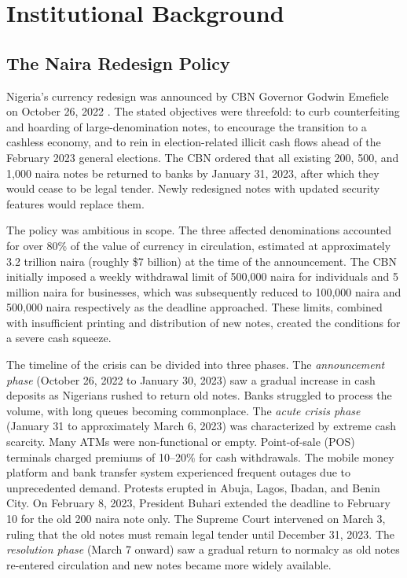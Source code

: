 \documentclass[12pt]{article}
\begin{document}
\section{Institutional Background}

\subsection{The Naira Redesign Policy}

Nigeria's currency redesign was announced by CBN Governor Godwin Emefiele on October 26, 2022 \citep{cbn2022redesign}. The stated objectives were threefold: to curb counterfeiting and hoarding of large-denomination notes, to encourage the transition to a cashless economy, and to rein in election-related illicit cash flows ahead of the February 2023 general elections. The CBN ordered that all existing 200, 500, and 1,000 naira notes be returned to banks by January 31, 2023, after which they would cease to be legal tender. Newly redesigned notes with updated security features would replace them.

The policy was ambitious in scope. The three affected denominations accounted for over 80\% of the value of currency in circulation, estimated at approximately 3.2 trillion naira (roughly \$7 billion) at the time of the announcement. The CBN initially imposed a weekly withdrawal limit of 500,000 naira for individuals and 5 million naira for businesses, which was subsequently reduced to 100,000 naira and 500,000 naira respectively as the deadline approached. These limits, combined with insufficient printing and distribution of new notes, created the conditions for a severe cash squeeze.

The timeline of the crisis can be divided into three phases. The \textit{announcement phase} (October 26, 2022 to January 30, 2023) saw a gradual increase in cash deposits as Nigerians rushed to return old notes. Banks struggled to process the volume, with long queues becoming commonplace. The \textit{acute crisis phase} (January 31 to approximately March 6, 2023) was characterized by extreme cash scarcity. Many ATMs were non-functional or empty. Point-of-sale (POS) terminals charged premiums of 10--20\% for cash withdrawals. The mobile money platform and bank transfer system experienced frequent outages due to unprecedented demand. Protests erupted in Abuja, Lagos, Ibadan, and Benin City. On February 8, 2023, President Buhari extended the deadline to February 10 for the old 200 naira note only. The Supreme Court intervened on March 3, ruling that the old notes must remain legal tender until December 31, 2023. The \textit{resolution phase} (March 7 onward) saw a gradual return to normalcy as old notes re-entered circulation and new notes became more widely available.
\end{document}
